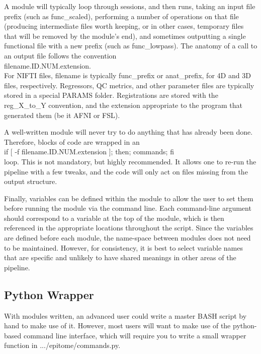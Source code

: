 \documentclass[final,titlepage,letterpaper,oneside,12pt]{article}
\renewcommand{\texttt}[2][BrickRed]{\textcolor{#1}{\ttfamily #2}}%
\begin{document}
A module will typically loop through sessions, and then runs, taking an input file prefix (such as \texttt{func\_scaled}), performing a number of operations on that file (producing intermediate files worth keeping, or in other cases, temporary files that will be removed by the module's end), and sometimes outputting a single functional file with a new prefix (such as \texttt{func\_lowpass}). The anatomy of a call to an output file follows the convention \\

\texttt{filename.ID.NUM.extension}. \\

For NIFTI files, \texttt{filename} is typically \texttt{func\_prefix} or \texttt{anat\_prefix}, for 4D and 3D files, respectively. Regressors, QC metrics, and other parameter files are typically stored in a special \texttt{PARAMS} folder. Registrations are stored with the \texttt{reg\_X\_to\_Y} convention, and the extension appropriate to the program that generated them (be it AFNI or FSL).

A well-written module will never try to do anything that has already been done. Therefore, blocks of code are wrapped in an \\

\texttt{if [ -f filename.ID.NUM.extension ]; then; commands; fi} \\

\noindent 
loop. This is not mandatory, but highly recommended. It allows one to re-run the pipeline with a few tweaks, and the code will only act on files missing from the output structure. 

Finally, variables can be defined within the module to allow the user to set them before running the module via the command line. Each command-line argument should correspond to a variable at the top of the module, which is then referenced in the appropriate locations throughout the script. Since the variables are defined before each module, the name-space between modules does not need to be maintained. However, for consistency, it is best to select variable names that are specific and unlikely to have shared meanings in other areas of the pipeline. 

\subsection{Python Wrapper}

With modules written, an advanced user could write a master BASH script by hand to make use of it. However, most users will want to make use of the python-based command line interface, which will require you to write a small wrapper function in \texttt{.../epitome/commands.py}.
\end{document}
